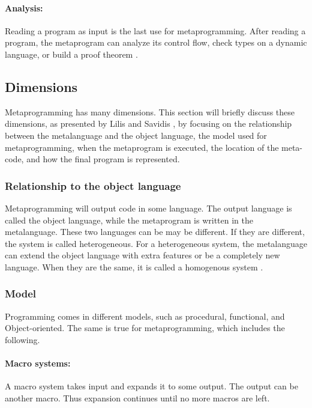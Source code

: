 \paragraph{Analysis:}
Reading a program as input is the last use for metaprogramming.
After reading a program, the metaprogram can analyze its control flow, check types on a dynamic language, or build a proof theorem \cite{sheard_01_01}.

\subsection{Dimensions}
Metaprogramming has many dimensions.
This section will briefly discuss these dimensions, as presented by Lilis and Savidis \cite{savidis_19_01}, by focusing on the relationship between the metalanguage and the object language, the model used for metaprogramming, when the metaprogram is executed, the location of the meta-code, and how the final program is represented.

\subsubsection{Relationship to the object language}
Metaprogramming will output code in some language.
The output language is called the object language, while the metaprogram is written in the metalanguage.
These two languages can be may be different.
If they are different, the system is called heterogeneous.
For a heterogeneous system, the metalanguage can extend the object language with extra features or be a completely new language.
When they are the same, it is called a homogenous system \cite{sheard_01_01}.


\subsubsection{Model}
Programming comes in different models, such as procedural, functional, and Object-oriented.
The same is true for metaprogramming, which includes the following.

\paragraph{Macro systems:}
A macro system takes input and expands it to some output.
The output can be another macro.
Thus expansion continues until no more macros are left.

